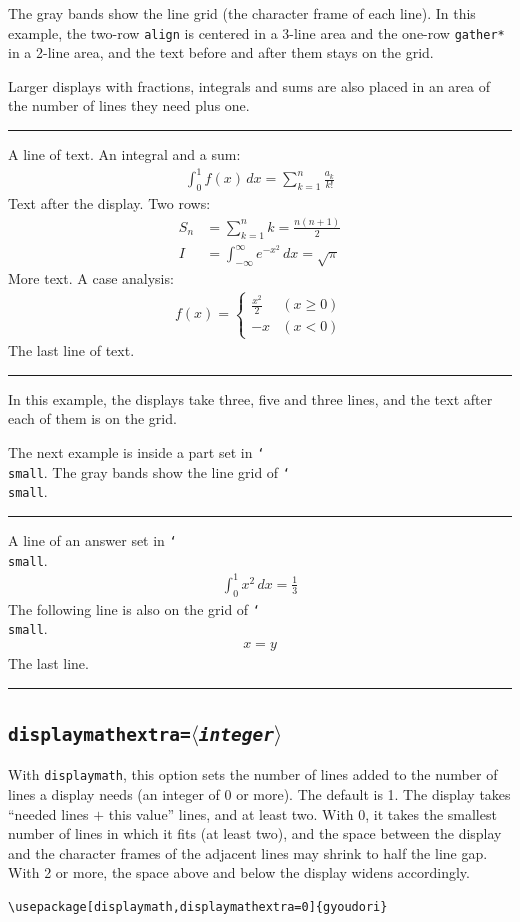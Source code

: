 \documentclass[paper=a4,dvipdfmx]{jlreq}
\newcommand\opt[1]{\texttt{#1}}
\newcommand\env[1]{\texttt{#1}}
\newcommand\cs[1]{\texttt{\char`\\#1}}
\newcommand\meta[1]{$\langle$\textit{#1}$\rangle$}
\newenvironment{demo}
  {\par\medskip\noindent
   \begin{minipage}{\linewidth}\hrule\smallskip}
  {\par\smallskip\hrule\end{minipage}\par\medskip}
\begin{document}
The gray bands show the line grid (the character frame of each line).
In this example, the two-row \env{align} is centered in a 3-line area and the
one-row \env{gather*} in a 2-line area, and the text before and after them stays on the
grid.

Larger displays with fractions, integrals and sums are also placed in an area of the number of lines they need plus one.

\begin{demo}
A line of text. An integral and a sum:
\begin{gather}
  \int_0^1 f(x)\,dx = \sum_{k=1}^{n} \frac{a_k}{k!}
\end{gather}
Text after the display. Two rows:
\begin{align}
  S_n &= \sum_{k=1}^{n} k = \frac{n(n+1)}{2} \\
  I &= \int_{-\infty}^{\infty} e^{-x^2}\,dx = \sqrt{\pi}
\end{align}
More text. A case analysis:
\begin{gather}
  f(x) =
  \begin{cases}
    \frac{x^2}{2} & (x \ge 0) \\
    -x & (x < 0)
  \end{cases}
\end{gather}
The last line of text.
\end{demo}

In this example, the displays take three, five and three lines, and the text after each of them is on the grid.

The next example is inside a part set in \cs{small}. The gray bands show the
line grid of \cs{small}.

\begin{demo}
\small{}A line of an answer set in \cs{small}.
\begin{gather*}
  \int_0^1 x^2\,dx = \frac{1}{3}
\end{gather*}
The following line is also on the grid of \cs{small}.
\begin{gather*}
  x = y
\end{gather*}
The last line.
\end{demo}

\subsection{\opt{displaymathextra=\meta{integer}}}\label{sec:displaymathextra}

With \opt{displaymath}, this option sets the number of lines added to the number
of lines a display needs (an integer of 0 or more). The default is 1. The display
takes ``needed lines $+$ this value'' lines, and at least two. With 0, it takes
the smallest number of lines in which it fits (at least two), and the space
between the display and the character frames of the adjacent lines may shrink to
half the line gap. With 2 or more, the space above and below the display widens
accordingly.
\begin{verbatim}
\usepackage[displaymath,displaymathextra=0]{gyoudori}
\end{verbatim}
\end{document}
